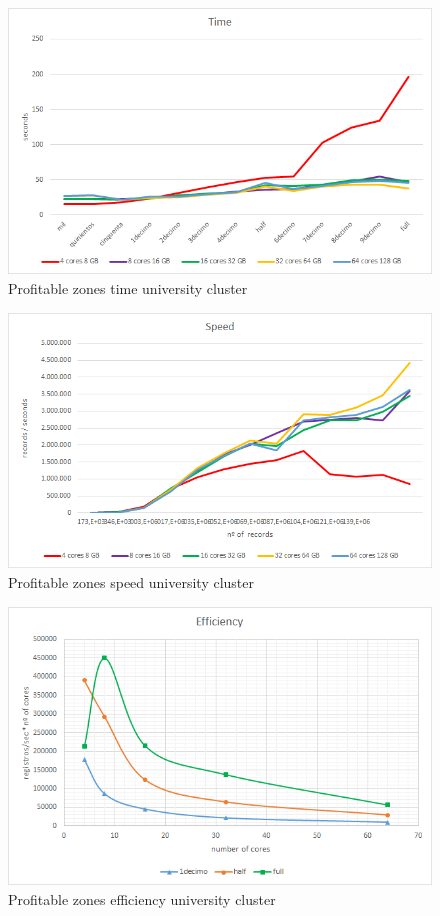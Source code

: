 \begin{figure}[htp!]
	\centering
	\caption{Profitable zones time university cluster}
	\label{tpru}
	\vspace{5pt}
	\includegraphics[scale=0.8]{geng/tpru}
\end{figure}
\begin{figure}[htp!]
	\centering
	\caption{Profitable zones speed university cluster}
	\label{spru}
	\vspace{5pt}
	\includegraphics[scale=0.85]{geng/spru}
\end{figure}
\begin{figure}[htp!]
	\centering
	\caption{Profitable zones efficiency university cluster}
	\label{epru}
	\vspace{5pt}
	\includegraphics[scale=0.85]{geng/epru}
\end{figure}

